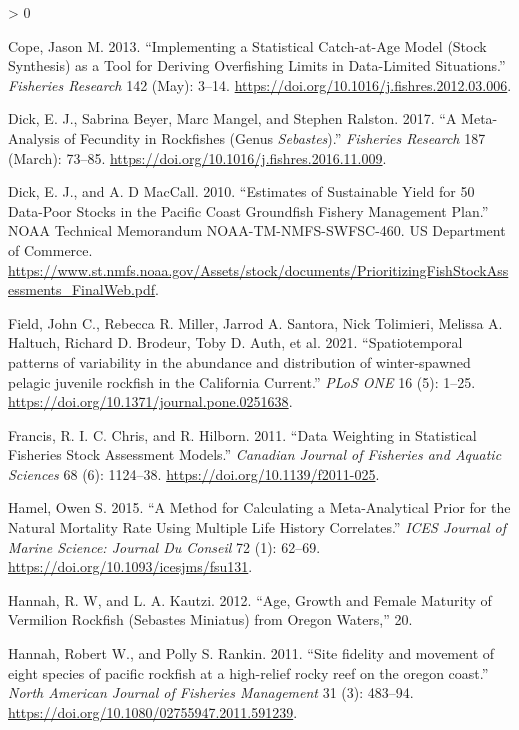 \documentclass[11pt,
  english,
  a4paper,
]{article}
\newlength{\cslhangindent}
\newenvironment{CSLReferences}[2] %
 {%
  \setlength{\parindent}{0pt}
  \ifodd #1 \everypar{\setlength{\hangindent}{\cslhangindent}}\ignorespaces\fi
  \ifnum #2 > 0
  \setlength{\parskip}{#2\baselineskip}
  \fi
 }%
 {}
\begin{document}
\hypertarget{refs}{}
\begin{CSLReferences}{1}{0}
\leavevmode\hypertarget{ref-cope_implementing_2013}{}%
Cope, Jason M. 2013. {``Implementing a Statistical Catch-at-Age Model (Stock Synthesis) as a Tool for Deriving Overfishing Limits in Data-Limited Situations.''} \emph{Fisheries Research} 142 (May): 3--14. \url{https://doi.org/10.1016/j.fishres.2012.03.006}.

\leavevmode\hypertarget{ref-dick_meta-analysis_2017}{}%
Dick, E. J., Sabrina Beyer, Marc Mangel, and Stephen Ralston. 2017. {``A Meta-Analysis of Fecundity in Rockfishes (Genus \emph{Sebastes}).''} \emph{Fisheries Research} 187 (March): 73--85. \url{https://doi.org/10.1016/j.fishres.2016.11.009}.

\leavevmode\hypertarget{ref-dick_estimates_2010}{}%
Dick, E. J., and A. D MacCall. 2010. {``Estimates of Sustainable Yield for 50 Data-Poor Stocks in the Pacific Coast Groundfish Fishery Management Plan.''} NOAA Technical Memorandum NOAA-TM-NMFS-SWFSC-460. US Department of Commerce. \url{https://www.st.nmfs.noaa.gov/Assets/stock/documents/PrioritizingFishStockAssessments_FinalWeb.pdf}.

\leavevmode\hypertarget{ref-Field2021}{}%
Field, John C., Rebecca R. Miller, Jarrod A. Santora, Nick Tolimieri, Melissa A. Haltuch, Richard D. Brodeur, Toby D. Auth, et al. 2021. {``{Spatiotemporal patterns of variability in the abundance and distribution of winter-spawned pelagic juvenile rockfish in the California Current}.''} \emph{PLoS ONE} 16 (5): 1--25. \url{https://doi.org/10.1371/journal.pone.0251638}.

\leavevmode\hypertarget{ref-francis_data_2011}{}%
Francis, R. I. C. Chris, and R. Hilborn. 2011. {``Data Weighting in Statistical Fisheries Stock Assessment Models.''} \emph{Canadian Journal of Fisheries and Aquatic Sciences} 68 (6): 1124--38. \url{https://doi.org/10.1139/f2011-025}.

\leavevmode\hypertarget{ref-hamel_method_2015}{}%
Hamel, Owen S. 2015. {``A Method for Calculating a Meta-Analytical Prior for the Natural Mortality Rate Using Multiple Life History Correlates.''} \emph{ICES Journal of Marine Science: Journal Du Conseil} 72 (1): 62--69. \url{https://doi.org/10.1093/icesjms/fsu131}.

\leavevmode\hypertarget{ref-hannah_age_2012}{}%
Hannah, R. W, and L. A. Kautzi. 2012. {``Age, Growth and Female Maturity of Vermilion Rockfish (Sebastes Miniatus) from Oregon Waters,''} 20.

\leavevmode\hypertarget{ref-Hannah2011}{}%
Hannah, Robert W., and Polly S. Rankin. 2011. {``{Site fidelity and movement of eight species of pacific rockfish at a high-relief rocky reef on the oregon coast}.''} \emph{North American Journal of Fisheries Management} 31 (3): 483--94. \url{https://doi.org/10.1080/02755947.2011.591239}.


\end{CSLReferences}
\end{document}
